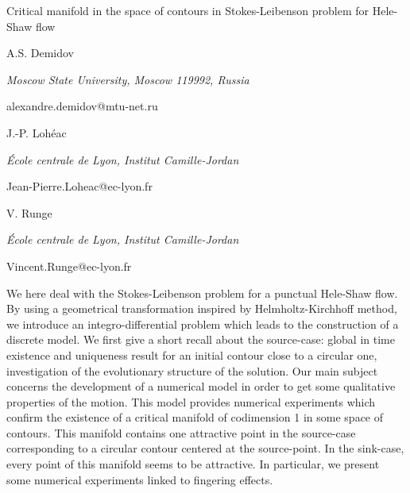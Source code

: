 \documentclass[10pt,a4paper]{article}
\begin{document}
\begin{center}

{\Large Critical manifold in the space of contours in Stokes-Leibenson problem for Hele-Shaw flow}

\bigskip

{\sc A.S. Demidov}

{\small\it Moscow State University, Moscow 119992, Russia}

{\small\rm alexandre.demidov@mtu-net.ru}

\bigskip

{\sc J.-P. Loh\'eac}

{\small\it \'Ecole centrale de Lyon, Institut Camille-Jordan}

{\small\rm Jean-Pierre.Loheac@ec-lyon.fr}

\bigskip

{\sc V. Runge}

{\small\it \'Ecole centrale de Lyon, Institut Camille-Jordan}

{\small\rm Vincent.Runge@ec-lyon.fr}

\end{center}

\bigskip


We here deal with the Stokes-Leibenson problem for a
punctual Hele-Shaw flow. By using a geometrical transformation
inspired by Helmholtz-Kirchhoff method, we introduce an
integro-differential problem which leads to the construction of
a discrete model.
We first give a short recall about the source-case: global in time
existence and uniqueness result for an initial contour close to a
circular one, investigation of the evolutionary structure of the solution.
Our main subject concerns the development of a numerical model
in order to get some qualitative properties of the motion.
This model provides numerical experiments which confirm the
existence of a critical manifold of codimension 1 in some space
of contours.
This manifold contains one attractive point in the source-case
corresponding to a circular contour centered at the source-point.
In the sink-case, every point of this manifold seems to be attractive.
In particular, we present some numerical experiments linked to
fingering effects.
\end{document}
